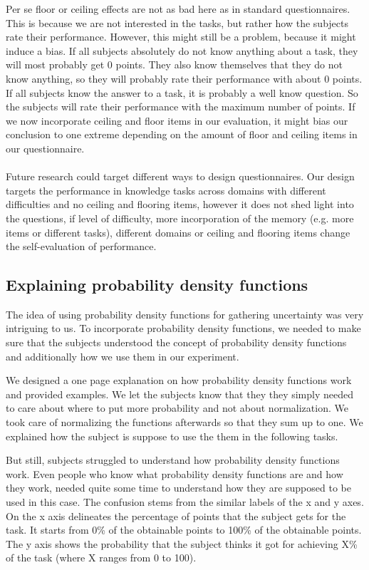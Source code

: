 \documentclass[../main/main.tex]{subfiles}
\begin{document}
	Per se floor or ceiling effects are not as bad here as in standard questionnaires. This is because we are not interested in the tasks, but rather how the subjects rate their performance. However, this might still be a problem, because it might induce a bias. If all subjects absolutely do not know anything about a task, they will most probably get 0 points. They also know themselves that they do not know anything, so they will probably rate their performance with about 0 points. If all subjects know the answer to a task, it is probably a well know question. So the subjects will rate their performance with the maximum number of points. If we now incorporate ceiling and floor items in our evaluation, it might bias our conclusion to one extreme depending on the amount of floor and ceiling items in our questionnaire.
	\\\\
	Future research could target different ways to design questionnaires. Our design targets the performance in knowledge tasks across domains with different difficulties and no ceiling and flooring items, however it does not shed light into the questions, if level of difficulty, more incorporation of the memory (e.g. more items or different tasks), different domains or ceiling and flooring items change the self-evaluation of performance.
	
	
	\subsection{Explaining probability density functions}
	\label{sec:explaining_pdf}
	
	The idea of using probability density functions for gathering uncertainty was very intriguing to us. To incorporate probability density functions, we needed to make sure that the subjects understood the concept of probability density functions and additionally how we use them in our experiment. 
	
	We designed a one page explanation on how probability density functions work and provided examples. We let the subjects know that they they simply needed to care about where to put more probability and not about normalization. We took care of normalizing the functions afterwards so that they sum up to one. We explained how the subject is suppose to use the them in the following tasks.
	
	But still, subjects struggled to understand how probability density functions work. Even people who know what probability density functions are and how they work, needed quite some time to understand how they are supposed to be used in this case. The confusion stems from the similar labels of the x and y axes. On the x axis delineates the percentage of points that the subject gets for the task. It starts from 0\% of the obtainable points to 100\% of the obtainable points. The y axis shows the probability that the subject thinks it got for achieving X\% of the task (where X ranges from 0 to 100).
	
\end{document}
